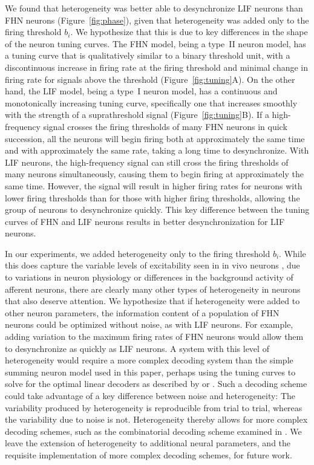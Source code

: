 \documentclass[letterpaper,11pt]{article}
\begin{document}
We found that heterogeneity was better able to desynchronize
LIF neurons than FHN neurons (Figure~\ref{fig:phase}),
given that heterogeneity was added only to the firing threshold $b_i$.
We hypothesize that this is due to key differences in the shape of the neuron tuning curves.
The FHN model, being a type~II neuron model,
has a tuning curve that is qualitatively similar to a binary threshold unit,
with a discontinuous increase in firing rate at the firing threshold
and minimal change in firing rate for signals above the threshold (Figure~\ref{fig:tuning}A).
On the other hand, the LIF model, being a type~I neuron model,
has a continuous and monotonically increasing tuning curve,
specifically one that increases smoothly with the strength of a
suprathreshold signal (Figure~\ref{fig:tuning}B).
If a high-frequency signal crosses the firing thresholds of many FHN neurons in quick succession, all the neurons will begin firing both at approximately the same time and with approximately the same rate, taking a long time to desynchronize. With LIF neurons, the high-frequency signal can still cross the firing thresholds of many neurons simultaneously, causing them to begin firing at approximately the same time. However, the signal will result in higher firing rates for neurons with lower firing thresholds than for those with higher firing thresholds, allowing the group of neurons to desynchronize quickly. This key difference between the tuning curves of FHN and LIF neurons results in better desynchronization for LIF neurons.

In our experiments, we added heterogeneity only to the firing threshold $b_i$. While this does capture the variable levels of excitability seen in in vivo neurons \citep{Mejias2012}, due to variations in neuron physiology or differences in the background activity of afferent neurons, there are clearly many other types of heterogeneity in neurons that also deserve attention.
We hypothesize that if heterogeneity were added to other neuron parameters,
the information content of a population of FHN neurons could be optimized without noise, as with LIF neurons.
For example, adding variation to the maximum firing rates of FHN neurons would allow them to desynchronize as quickly as LIF neurons. A system with this level of heterogeneity would require a more complex decoding system than the simple summing neuron model used in this paper, perhaps using the tuning curves to solve for the optimal linear decoders as described by \cite{Salinas1994} or \cite{Eliasmith2003}. Such a decoding scheme could take advantage of a key difference between noise and heterogeneity: The variability produced by heterogeneity is reproducible from trial to trial, whereas the variability due to noise is not. Heterogeneity thereby allows for more complex decoding schemes, such as the combinatorial decoding scheme examined in \cite{Osborne2008}. We leave the extension of heterogeneity to additional neural parameters, and the requisite implementation of more complex decoding schemes, for future work.
\end{document}
